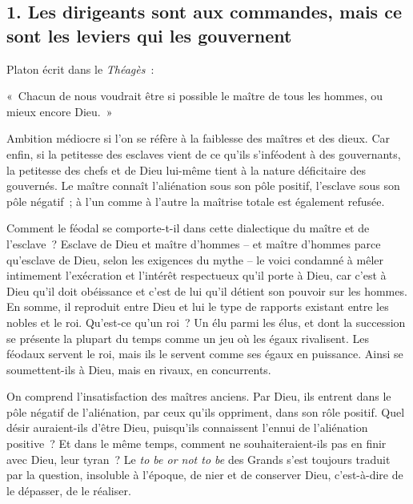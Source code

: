 \documentclass[french,twoside]{book} %
\newenvironment{quoteblock}%
  {\begin{quoting}}
  {\end{quoting}}
\newenvironment{quotebar}{%
    \def\FrameCommand{{\color{rubric!10!}\vrule width 0.5em} \hspace{0.9em}}%
    \def\OuterFrameSep{\itemsep} %
    \MakeFramed {\advance\hsize-\width \FrameRestore}
  }%
  {%
    \endMakeFramed
  }
\renewenvironment{quoteblock}%
  {%
    \savenotes
    \setstretch{0.9}
    \normalfont
    \begin{quotebar}
  }
  {%
    \end{quotebar}
    \spewnotes
  }
\begin{document}
\subsection[{1. Les dirigeants sont aux commandes, mais ce sont les leviers qui les gouvernent}]{\textsc{1.} Les dirigeants sont aux commandes, mais ce sont les leviers qui les gouvernent}
\noindent Platon écrit dans le \emph{Théagès} :\par

\begin{quoteblock}
\noindent « Chacun de nous voudrait être si possible le maître de tous les hommes, ou mieux encore Dieu. »\end{quoteblock}

\noindent  Ambition médiocre si l’on se réfère à la faiblesse des maîtres et des dieux. Car enfin, si la petitesse des esclaves vient de ce qu’ils s’inféodent à des gouvernants, la petitesse des chefs et de Dieu lui-même tient à la nature déficitaire des gouvernés. Le maître connaît l’aliénation sous son pôle positif, l’esclave sous son pôle négatif ; à l’un comme à l’autre la maîtrise totale est également refusée.\par
Comment le féodal se comporte-t-il dans cette dialectique du maître et de l’esclave ? Esclave de Dieu et maître d’hommes – et maître d’hommes parce qu’esclave de Dieu, selon les exigences du mythe – le voici condamné à mêler intimement l’exécration et l’intérêt respectueux qu’il porte à Dieu, car c’est à Dieu qu’il doit obéissance et c’est de lui qu’il détient son pouvoir sur les hommes. En somme, il reproduit entre Dieu et lui le type de rapports existant entre les nobles et le roi. Qu’est-ce qu’un roi ? Un élu parmi les élus, et dont la succession se présente la plupart du temps comme un jeu où les égaux rivalisent. Les féodaux servent le roi, mais ils le servent comme ses égaux en puissance. Ainsi se soumettent-ils à Dieu, mais en rivaux, en concurrents.\par
On comprend l’insatisfaction des maîtres anciens. Par Dieu, ils entrent dans le pôle négatif de l’aliénation, par ceux qu’ils oppriment, dans son rôle positif. Quel désir auraient-ils d’être Dieu, puisqu’ils connaissent l’ennui de l’aliénation positive ? Et dans le même temps, comment ne souhaiteraient-ils pas en finir avec Dieu, leur tyran ? Le \emph{to be or not to be} des Grands s’est toujours traduit par la question, insoluble à l’époque, de nier et de conserver Dieu, c’est-à-dire de le dépasser, de le réaliser.\par
\end{document}
